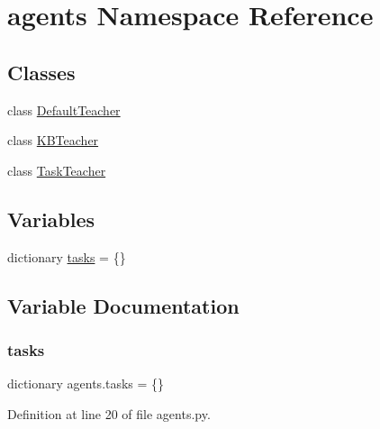 \hypertarget{namespaceagents}{}\section{agents Namespace Reference}
\label{namespaceagents}
\subsection*{Classes}
\begin{DoxyCompactItemize}
\item 
class \hyperlink{classagents_1_1DefaultTeacher}{Default\+Teacher}
\item 
class \hyperlink{classagents_1_1KBTeacher}{K\+B\+Teacher}
\item 
class \hyperlink{classagents_1_1TaskTeacher}{Task\+Teacher}
\end{DoxyCompactItemize}
\subsection*{Variables}
\begin{DoxyCompactItemize}
\item 
dictionary \hyperlink{namespaceagents_a03ab9d07197b0cb5b97b163c99bcc449}{tasks} = \{\}
\end{DoxyCompactItemize}


\subsection{Variable Documentation}
\mbox{\label{namespaceagents_a03ab9d07197b0cb5b97b163c99bcc449}} 
\subsubsection{\texorpdfstring{tasks}{tasks}}
{\footnotesize\ttfamily dictionary agents.\+tasks = \{\}}



Definition at line 20 of file agents.\+py.

